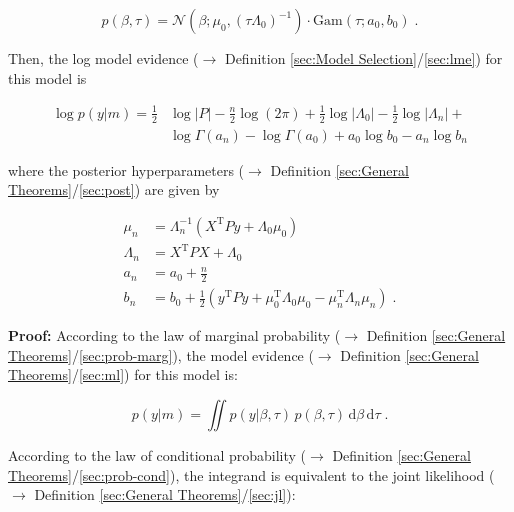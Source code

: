 \documentclass[a4paper,12pt,twoside]{book}
\begin{document}
\begin{equation} \label{eq:blr-lme-GLM-NG-prior}
p(\beta,\tau) = \mathcal{N}(\beta; \mu_0, (\tau \Lambda_0)^{-1}) \cdot \mathrm{Gam}(\tau; a_0, b_0) \; .
\end{equation}

Then, the log model evidence ($\rightarrow$ Definition \ref{sec:Model Selection}/\ref{sec:lme}) for this model is

\begin{equation} \label{eq:blr-lme-GLM-NG-LME}
\begin{split}
\log p(y|m) = \frac{1}{2} & \log |P| - \frac{n}{2} \log (2 \pi)  + \frac{1}{2} \log |\Lambda_0| - \frac{1}{2} \log |\Lambda_n| + \\
& \log \Gamma(a_n) - \log \Gamma(a_0) + a_0 \log b_0 - a_n \log b_n
\end{split}
\end{equation}

where the posterior hyperparameters ($\rightarrow$ Definition \ref{sec:General Theorems}/\ref{sec:post}) are given by

\begin{equation} \label{eq:blr-lme-GLM-NG-post-par}
\begin{split}
\mu_n &= \Lambda_n^{-1} (X^\mathrm{T} P y + \Lambda_0 \mu_0) \\
\Lambda_n &= X^\mathrm{T} P X + \Lambda_0 \\
a_n &= a_0 + \frac{n}{2} \\
b_n &= b_0 + \frac{1}{2} (y^\mathrm{T} P y + \mu_0^\mathrm{T} \Lambda_0 \mu_0 - \mu_n^\mathrm{T} \Lambda_n \mu_n) \; .
\end{split}
\end{equation}


\vspace{1em}
\textbf{Proof:} According to the law of marginal probability ($\rightarrow$ Definition \ref{sec:General Theorems}/\ref{sec:prob-marg}), the model evidence ($\rightarrow$ Definition \ref{sec:General Theorems}/\ref{sec:ml}) for this model is:

\begin{equation} \label{eq:blr-lme-GLM-NG-ME-s1}
p(y|m) = \iint p(y|\beta,\tau) \, p(\beta,\tau) \, \mathrm{d}\beta \, \mathrm{d}\tau \; .
\end{equation}

According to the law of conditional probability ($\rightarrow$ Definition \ref{sec:General Theorems}/\ref{sec:prob-cond}), the integrand is equivalent to the joint likelihood ($\rightarrow$ Definition \ref{sec:General Theorems}/\ref{sec:jl}):
\end{document}
